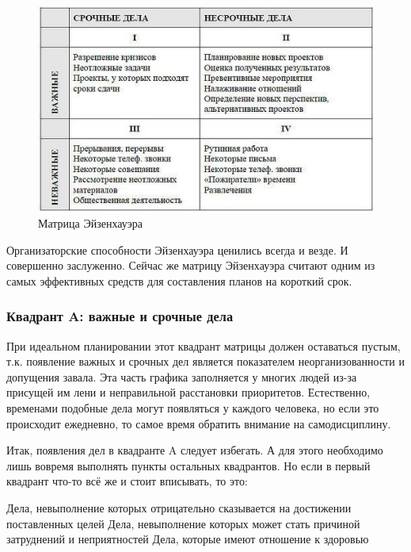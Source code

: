 \label{page:domain:piramida_franklina}
\begin{figure}
\centering
  \includegraphics[scale=0.85]{images/eizinhower.jpg}  
  \caption{ Матрица Эйзенхауэра }
  \label{fig:domain:eizenhower}
\end{figure}

Организаторские способности Эйзенхауэра ценились всегда и везде. И совершенно заслуженно. Сейчас же матрицу Эйзенхауэра считают одним из самых эффективных средств для составления планов на короткий срок.



\subsubsection{Квадрант A: важные и срочные дела }


При идеальном планировании этот квадрант матрицы должен оставаться пустым, т.к. появление важных и срочных дел является показателем неорганизованности и допущения завала. Эта часть графика заполняется у многих людей из-за присущей им лени и неправильной расстановки приоритетов. Естественно, временами подобные дела могут появляться у каждого человека, но если это происходит ежедневно, то самое время обратить внимание на самодисциплину.

Итак, появления дел в квадранте A следует избегать. А для этого необходимо лишь вовремя выполнять пункты остальных квадрантов. Но если в первый квадрант что-то всё же и стоит вписывать, то это:

    Дела, невыполнение которых отрицательно сказывается на достижении поставленных целей
    Дела, невыполнение которых может стать причиной затруднений и неприятностей
    Дела, которые имеют отношение к здоровью


